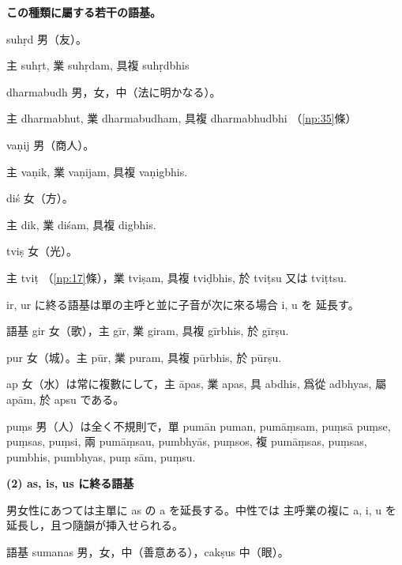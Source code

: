 \numberParagraph
\textbf{この種類に屬する若干の語基。}

suhṛd 男（友）。

主 suhṛt, 業 suhṛdam, 具複 suhṛdbhis

dharmabudh 男，女，中（法に明かなる）。

主 dharmabhut, 業 dharmabudham, 具複 dharmabhudbhi （\ref{np:35}條）

vaṇij 男（商人）。

主 vaṇik, 業 vaṇijam, 具複 vaṇigbhis.

diś 女（方）。

主 dik, 業 diśam, 具複 digbhis.

tviṣ 女（光）。

主 tviṭ （\ref{np:17}條），業 tviṣam, 具複 tviḍbhis, 於 tviṭsu 又は
tviṭtsu.

ir, ur に終る語基は單の主呼と並に子音が次に來る場合 i, u を
延長す。

語基 gir 女（歌），主 gīr, 業 giram, 具複 gīrbhis, 於 gīrṣu.

pur 女（城）。主 pūr, 業 puram, 具複 pūrbhis, 於 pūrṣu.

ap 女（水）は常に複數にして，主 āpas, 業 apas, 具 abdhis,
爲從 adbhyas, 屬 apām, 於 apsu である。

puṃs 男（人）は全く不規則で，單 pumān puman, pumāṃsam,
puṃsā puṃse, puṃsas, puṃsi, 兩 pumāṃsau, pumbhyās,
puṃsos, 複 pumāṃsas, puṃsas, pumbhis, pumbhyas, puṃ\-%
sām, puṃsu.

\begin{center}\textbf{(2) as, is, us に終る語基}\end{center}

\numberParagraph
男女性にあつては主單に as の a を延長する。中性では
主呼業の複に a, i, u を延長し，且つ隨韻が挿入せられる。

語基 sumanas 男，女，中（善意ある），cakṣus 中（眼）。


